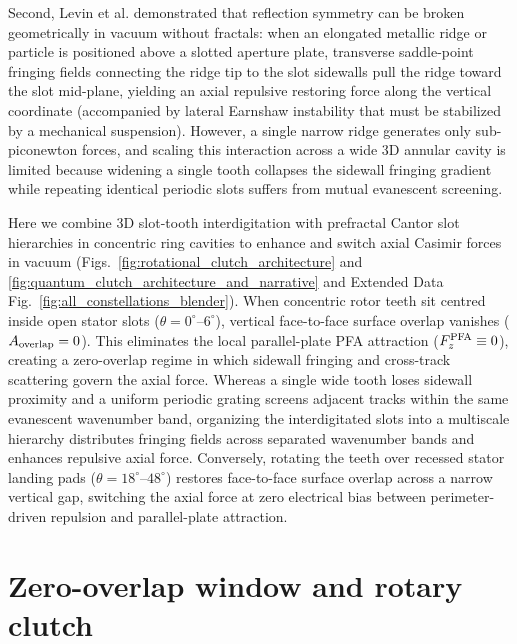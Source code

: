 \documentclass[pdflatex,sn-nature]{sn-jnl}
\begin{document}
Second, Levin et al.\cite{levin2010} demonstrated that reflection symmetry can be broken geometrically in vacuum without fractals: when an elongated metallic ridge or particle is positioned above a slotted aperture plate, transverse saddle-point fringing fields connecting the ridge tip to the slot sidewalls pull the ridge toward the slot mid-plane, yielding an axial repulsive restoring force along the vertical coordinate (accompanied by lateral Earnshaw instability that must be stabilized by a mechanical suspension)\cite{levin2010,rodriguez2011}. However, a single narrow ridge generates only sub-piconewton forces\cite{levin2010,rodriguez2011}, and scaling this interaction across a wide 3D annular cavity is limited because widening a single tooth collapses the sidewall fringing gradient while repeating identical periodic slots suffers from mutual evanescent screening.

Here we combine 3D slot-tooth interdigitation with prefractal Cantor slot hierarchies in concentric ring cavities to enhance and switch axial Casimir forces in vacuum (Figs.~\ref{fig:rotational_clutch_architecture} and \ref{fig:quantum_clutch_architecture_and_narrative} and Extended Data Fig.~\ref{fig:all_constellations_blender}). When concentric rotor teeth sit centred inside open stator slots ($\theta = 0^\circ\text{--}6^\circ$), vertical face-to-face surface overlap vanishes ($A_{\rm overlap} = 0$). This eliminates the local parallel-plate PFA attraction ($F_z^{\rm PFA} \equiv 0$), creating a zero-overlap regime in which sidewall fringing and cross-track scattering govern the axial force. Whereas a single wide tooth loses sidewall proximity and a uniform periodic grating screens adjacent tracks within the same evanescent wavenumber band, organizing the interdigitated slots into a multiscale hierarchy distributes fringing fields across separated wavenumber bands and enhances repulsive axial force. Conversely, rotating the teeth over recessed stator landing pads ($\theta = 18^\circ\text{--}48^\circ$) restores face-to-face surface overlap across a narrow vertical gap, switching the axial force at zero electrical bias between perimeter-driven repulsion and parallel-plate attraction.

\section*{Zero-overlap window and rotary clutch}
\label{sec:architecture}
\end{document}
